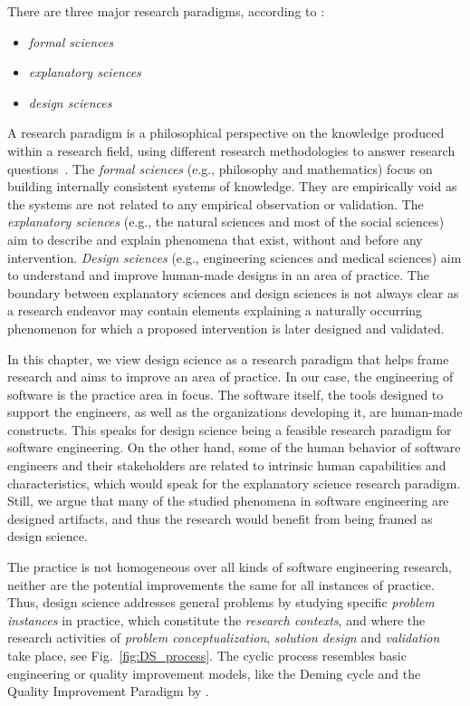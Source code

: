 \documentclass[graybox]{svmult}
\begin{document}
There are three major research paradigms, according to \cite{van_aken_management_2004}:
\begin{itemize}
\item \emph{formal sciences} %
\item \emph{explanatory sciences} %
\item \emph{design sciences}%
\end{itemize}

A research paradigm is a philosophical perspective on the knowledge produced within a research field, using different research methodologies to answer research questions~\citep{van_aken_management_2004}. 
The \emph{formal sciences} (e.g., philosophy and mathematics) focus on building internally consistent systems of knowledge. They are empirically void as the systems are not related to any empirical observation or validation. The \emph{explanatory sciences} (e.g., the natural sciences and most of the social sciences) aim to describe and explain phenomena that exist, without and before any intervention. \emph{Design sciences} (e.g., engineering sciences and medical sciences) aim to understand and improve human-made designs in an area of practice. The boundary between explanatory sciences and design sciences is not always clear as a research endeavor may contain elements explaining a naturally occurring phenomenon for which a proposed intervention is later designed and validated. 

In this chapter, we view design science as a research paradigm that helps frame research and aims to improve an area of practice. In our case, the engineering of software is the practice area in focus. The software itself, the tools designed to support the engineers, as well as the organizations developing it, are human-made constructs. This speaks for design science being a feasible research paradigm for software engineering. On the other hand, some of the human behavior of software engineers and their stakeholders are related to intrinsic human capabilities and characteristics, which would speak for the explanatory science research paradigm. Still, we argue that many of the studied phenomena in software engineering are designed artifacts, and thus the research would benefit from being framed as design science.

The practice is not homogeneous over all kinds of software engineering research, neither are the potential improvements the same for all instances of practice. Thus, design science addresses general problems by studying specific \emph{problem instances} in practice, which constitute the \emph{research contexts}, and where the research activities of \emph{problem conceptualization}, \emph{solution design} and \emph{validation} take place, see Fig.~\ref{fig:DS_process}. 
The cyclic process resembles basic engineering or quality improvement models, like the Deming cycle \citep{Deming1986} and the Quality Improvement Paradigm by \cite{Basili92}.
\end{document}
